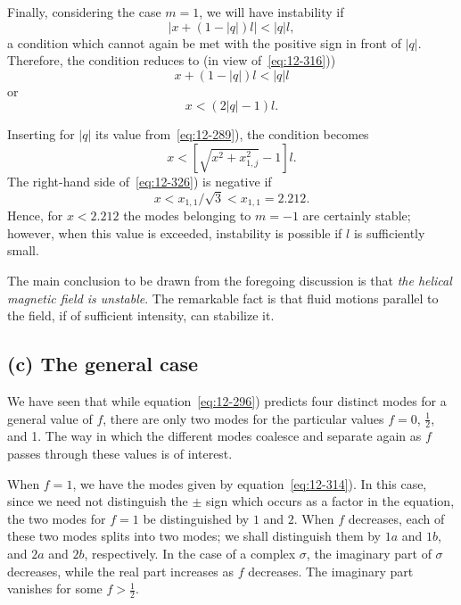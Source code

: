 Finally, considering the case $m = 1$, we will have instability if
\begin{equation}
\label{eq:12-323}
|x + (1-|q|)l| < |q|l,
\end{equation}
a condition which cannot again be met with the positive sign in front of $|q|$. Therefore, the condition reduces to (in view of~\eqref{eq:12-316}))
\begin{equation}
\label{eq:12-324}
x + (1-|q|)l < |q|l
\end{equation}
or
\begin{equation}
\label{eq:12-325}
x < (2|q|-1)l.
\end{equation}

Inserting for $|q|$ its value from~\eqref{eq:12-289}), the condition becomes
\begin{equation}
\label{eq:12-326}
x < \left[\sqrt{x^2+x^2_{1,j}}-1\right]l.
\end{equation}
The right-hand side of~\eqref{eq:12-326}) is negative if
\begin{equation}
\label{eq:12-327}
x < x_{1,1}/\sqrt{3} < x_{1,1} = 2.212.
\end{equation}
Hence, for $x < 2.212$ the modes belonging to $m = -1$ are certainly stable; however, when this value is exceeded, instability is possible if $l$ is sufficiently small.

The main conclusion to be drawn from the foregoing discussion is that \emph{the helical magnetic field is unstable}. The remarkable fact is that fluid motions parallel to the field, if of sufficient intensity, can stabilize it.

\subsection*{(c) The general case}

We have seen that while equation~\eqref{eq:12-296}) predicts four distinct modes for a general value of $f$, there are only two modes for the particular values $f = 0$, $\frac{1}{2}$, and 1. The way in which the different modes coalesce and separate again as $f$ passes through these values is of interest.

When $f = 1$, we have the modes given by equation~\eqref{eq:12-314}). In this case, since we need not distinguish the $\pm$ sign which occurs as a factor in the equation, the two modes for $f = 1$ be distinguished by $1$ and $2$. When $f$ decreases, each of these two modes splits into two modes; we shall distinguish them by $1a$ and $1b$, and $2a$ and $2b$, respectively. In the case of a complex $\sigma$, the imaginary part of $\sigma$ decreases, while the real part increases as $f$ decreases. The imaginary part vanishes for some $f > \frac{1}{2}$.

